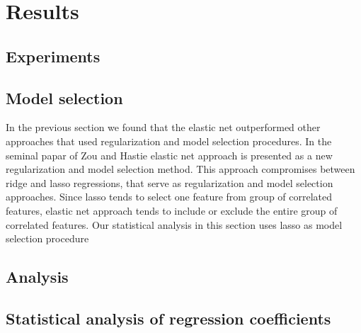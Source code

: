 \documentclass{article}
\begin{document}
\section{Results}


\subsection{Experiments}

\subsection{Model selection}
In the  previous section we found that the elastic net outperformed other approaches that used regularization and model selection procedures. In the seminal papar of Zou and Hastie elastic net approach is presented as  a new regularization and model selection method. This approach compromises between ridge and lasso regressions, that serve as regularization and model selection approaches. Since lasso tends to select one feature from group of correlated features, elastic net approach tends to include or exclude the entire group of correlated features. Our statistical analysis in this section uses lasso as model selection procedure 

\subsection{Analysis}
\newpage
\subsection{Statistical analysis of regression coefficients}


\end{document}
